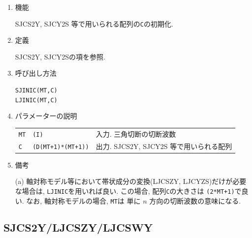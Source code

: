 \documentclass[a4j]{jarticle}
\begin{document}
\begin{enumerate}

\item 機能 

SJCS2Y, SJCY2S 等で用いられる配列の{\tt C}の初期化.

\item 定義

SJCS2Y, SJCY2Sの項を参照.

\item 呼び出し方法 

{\tt SJINIC(MT,C)}\\
{\tt LJINIC(MT,C)}
  
\item パラメーターの説明

\begin{tabular}{lll}
{\tt MT} & {\tt (I)} & 入力. 三角切断の切断波数\\
{\tt C} & {\tt (D(MT+1)*(MT+1))} & 出力. SJCS2Y, SJCY2S 等で用いられる配列
\end{tabular}

\item 備考

(a) 軸対称モデル等において帯状成分の変換(LJCSZY, LJCYZS)だけが必要な場合は,
    {\tt LJINIC}を用いれば良い.  この場合, 配列{\tt C}の大きさは
    {\tt (2*MT+1)}で良い. なお, 軸対称モデルの場合, {\tt MT}は
    単に $n$ 方向の切断波数の意味になる.
    
\end{enumerate}


\subsection{SJCS2Y/LJCSZY/LJCSWY}
\end{document}
